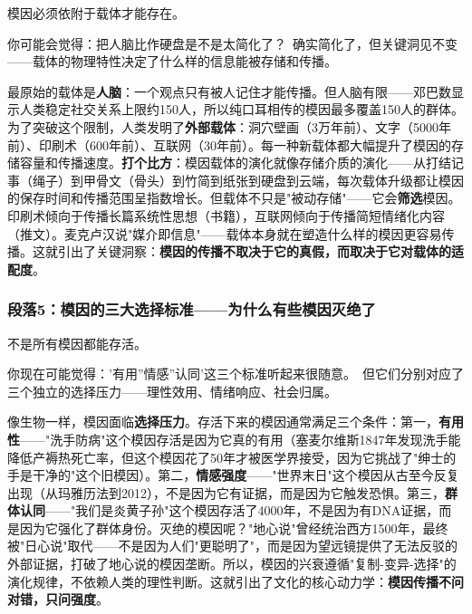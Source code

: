 \documentclass[../main.tex]{subfiles}
\begin{document}
	模因必须依附于载体才能存在。

	\begin{tcolorbox}[colback=yellow!5, title=\textit{读者行为预测}]

		你可能会觉得：把人脑比作硬盘是不是太简化了？\ 确实简化了，但关键洞见不变——载体的物理特性决定了什么样的信息能被存储和传播。

	\end{tcolorbox}

最原始的载体是\textbf{人脑}：一个观点只有被人记住才能传播。但人脑有限——邓巴数显示人类稳定社交关系上限约150人，所以纯口耳相传的模因最多覆盖150人的群体。为了突破这个限制，人类发明了\textbf{外部载体}：洞穴壁画（3万年前）、文字（5000年前）、印刷术（600年前）、互联网（30年前）。每一种新载体都大幅提升了模因的存储容量和传播速度。\textbf{打个比方}：模因载体的演化就像存储介质的演化——从打结记事（绳子）到甲骨文（骨头）到竹简到纸张到硬盘到云端，每次载体升级都让模因的保存时间和传播范围呈指数增长。但载体不只是"被动存储"——它会\textbf{筛选}模因。印刷术倾向于传播长篇系统性思想（书籍），互联网倾向于传播简短情绪化内容（推文）。麦克卢汉说"媒介即信息"——载体本身就在塑造什么样的模因更容易传播。这就引出了关键洞察：\textbf{模因的传播不取决于它的真假，而取决于它对载体的适配度}。

	\subsubsection*{段落5：模因的三大选择标准——为什么有些模因灭绝了}

	不是所有模因都能存活。

	\begin{tcolorbox}[colback=yellow!5, title=\textit{读者行为预测}]

		你现在可能觉得：'有用''情感''认同'这三个标准听起来很随意。\ 但它们分别对应了三个独立的选择压力——理性效用、情绪响应、社会归属。

	\end{tcolorbox}

像生物一样，模因面临\textbf{选择压力}。存活下来的模因通常满足三个条件：第一，\textbf{有用性}——"洗手防病"这个模因存活是因为它真的有用（塞麦尔维斯1847年发现洗手能降低产褥热死亡率，但这个模因花了50年才被医学界接受，因为它挑战了"绅士的手是干净的"这个旧模因）。第二，\textbf{情感强度}——"世界末日"这个模因从古至今反复出现（从玛雅历法到2012），不是因为它有证据，而是因为它触发恐惧。第三，\textbf{群体认同}——"我们是炎黄子孙"这个模因存活了4000年，不是因为有DNA证据，而是因为它强化了群体身份。灭绝的模因呢？"地心说"曾经统治西方1500年，最终被"日心说"取代——不是因为人们"更聪明了"，而是因为望远镜提供了无法反驳的外部证据，打破了地心说的模因垄断。所以，模因的兴衰遵循"复制-变异-选择"的演化规律，不依赖人类的理性判断。这就引出了文化的核心动力学：\textbf{模因传播不问对错，只问强度}。
\end{document}
